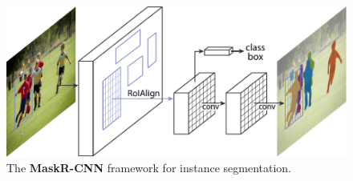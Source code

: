 \documentclass[10pt,twocolumn,letterpaper]{article}
\begin{document}
\begin{figure}[t]
\centering
\includegraphics[width=1\linewidth]{ai/teaser}\vspace{2mm}
\caption{The \textbf{Mask\hspace{0.1297em}R-CNN} framework for instance segmentation.}
\label{fig:teaser}\vspace{-1mm}
\end{figure}
\end{document}
